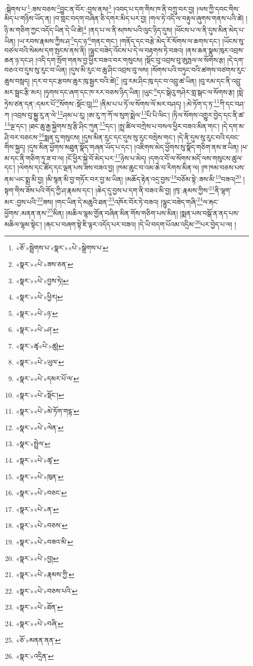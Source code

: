 :སྒེགས་པ་\footnote{«ཅོ་»སྦྲེགས་པ་«སྣར་»«པེ་»སྒྲེགས་པ་}:ཟས་བཅས་\footnote{«སྣར་»«པེ་»ཟས་ཅན་}བྱུང་ན་བོར་:བྱས་ནས།\footnote{«སྣར་»«པེ་»བྱས་ཏེ།} །འབད་པ་དག་གིས་ཁ་ནི་བཀྲུ་བར་བྱ། །ལས་ཀྱི་དབང་གིས་མིད་པ་གཉིས་ཡོད་ན། །བ་གླང་བདག་བཞིན་ཅི་དགར་མིད་པར་བྱ། །གལ་ཏེ་འདི་ལ་བརྟུལ་ཞུགས་གནས་པའི་ཚེ། །ཉི་མ་གཅིག་ཀྱང་འདོད་ཡིན་དེ་ཡི་ཚེ།\footnote{«སྣར་»«པེ་»ཕྱིར།} །ནད་པ་ལ་ནི་མཁས་པའི་ལུང་ཉིད་དུས། །ཕོངས་པ་ལ་ནི་དུས་མིན་མེད་པ་ཡིན། །ཡ་རབས་རྣམས་ཀྱིས་ཤ་\footnote{«སྣར་»«པེ་»ཉ་}དང་ཉ་\footnote{«སྣར་»«པེ་»ཤ་}གནང་གང་། །གནོད་དང་བརྩེ་མེད་རོ་སོགས་ལ་ཆགས་དང་། །ཡོངས་སུ་བཙལ་བའི་སེམས་དག་སྤངས་ནས་ནི། །ལྷུང་བཟེད་འོངས་པ་དེ་ལ་བརྟགས་ཏེ་བཟའ། །ནས་ཆན་སྣུམ་ཁུར་འབྲས་ཆན་ཉ་དང་ཤ །འདི་དག་སྲོག་གནས་བྱ་ཕྱིར་བཟའ་བར་གསུངས། །སྡོང་བུ་འབྲས་བུ་ཨུཏྤལ་ལ་སོགས་རྩ། །དེ་དག་བཅའ་བ་དུས་སུ་རུང་བ་ཡིན། །དུས་མི་རུང་བ་ཆུ་ཤིང་འབྲས་བུ་ལས། །སོགས་པའི་བཏུང་བའི་ཚགས་བཙགས་རུང་ཆུས་བསླད། །དར་བ་དང་རྩབས་ཆུར་ཁུ་སྦྱར་བའི་ཚེ།\footnote{«སྣར་»ཚྭ«པེ་»ཚུ།} །བུ་རམ་ཤིང་ཁུ་དང་བ་འབྲུ་ཚ་ཡིན། །བུ་རམ་དང་ནི་འབྲུ་མར་སྦྲང་རྩི་མར། །ཧྭགས་དང་ཞག་དང་ཁ་རར་བཅས་ཉིད་ཡིན། །ཡུང་\footnote{«སྣར་»«པེ་»ཡུལ་}དང་སྒེའུ་གཤེར་གླ་སྒང་ལ་སོགས་རྩ། །སླེ་ཏྲེས་ཙན་དན་:དམར་པོ་\footnote{«སྣར་»«པེ་»དམར་པོ་ལ་}སོགས་:སྡོང་བུ།\footnote{«སྣར་»«པེ་»སྡོང་།} །ནིམ་པ་པ་ཏོ་ལ་སོགས་ལོ་མར་བཤད། །:མེ་ཏོག་ད་ཏ་\footnote{«སྣར་»«པེ་»མེ་ཏོག་གདྷ་}ཀི་དང་བཤ་ཀ །འབྲས་བུ་སྐྱུ་རུ་ན་ལེ་\footnote{«སྣར་»«པེ་»ལེན་}ཤམ་པ་རུ། །ཨ་རུ་ཀ་ཀོ་ལ་སུག་སྨེལ་\footnote{«སྣར་»སྤྲེལ་}པི་པི་ལིང་། །ཏིལ་སོགས་འགྱུར་བྱེད་དང་ནི་ཚ་\footnote{«སྣར་»«པེ་»ཚྭ་}ལྔ་དང་། །ཐང་ཆུ་རྒྱ་སྐྱེགས་སྲ་རྩི་ཤིང་ཀུན་\footnote{«སྣར་»«པེ་»ཁུན་}དང་། །སྤྲ་ཚིལ་བཀྲེས་པ་བསལ་ཕྱིར་བཟའ་མིན་གང་། །དེ་དག་མ་ཤི་བར་བཅངས་\footnote{«སྣར་»«པེ་»བཅང་}སྨན་དུ་གསུངས། །དུས་མིན་རུང་དང་དུས་སུ་རུང་བསྲེས་གང་། །དེ་ནི་དུས་སུ་རུང་བའི་དབང་གིས་སྐྱད། །དུས་མིན་ཕྱོགས་མཐུན་སྣོད་གཞན་ཡོད་པ་དང་། །འཇིགས་མེད་ཕྱོགས་སུ་སྣོད་གཅིག་ནས་ཟ་ཡིན། །ཕ་མ་དང་ནི་གཅིག་ཏུ་ཟ་བ་ལ། །ངོ་ཕྱིར་སྐྱེ་བོ་མེད་པར་\footnote{«སྣར་»«པེ་»ན་}ཉེས་པ་མེད། །དགའ་བོ་ལ་སོགས་མདོ་ལས་གསུངས་ཚུལ་དང་། །ལེགས་དང་ཚོད་དང་ལྡན་པས་ཟས་བཟའ་བྱ། །ཁམ་ཆུང་བ་འམ་ཆེ་བ་རིགས་མིན་ལ། །ཁ་ཁམ་བཅས་པས་ནམ་ཡང་སྨྲ་མི་བྱ། །མི་སྙན་མི་བྱ་གཏོར་བར་བྱ་མ་ཡིན། །མཆོད་རྟེན་འདྲ་བྱས་\footnote{«སྣར་»«པེ་»བཅས་}བཅོམ་སྟེ་:ཟས་མི་\footnote{«སྣར་»«པེ་»བཟའ་མི་}བཟའ།\footnote{«སྣར་»«པེ་»བྱ།} །སྟག་གིས་ཟོས་པའི་གོད་ཀྱི་ཤ་རྣམས་དང་། །ཆེད་དུ་བྱས་པ་དག་ནི་བཟའ་མི་བྱ། །ཁྭ་:རྣམས་ཀྱིས་\footnote{«སྣར་»«པེ་»རྣམས་ཀྱི་}ནི་ལྷག་མར་:བྱས་པའི་\footnote{«སྣར་»«པེ་»བཅས་པའི་}ཟས། །གང་ཡིན་དེ་མཆུའི་ཐན་\footnote{«སྣར་»«པེ་»ཐོན་}འཁོར་བོར་ཏེ་བཟའ། །ལྷུང་བཟེད་གཞི་\footnote{«སྣར་»«པེ་»བཞི་}ལ་རྐང་ཕྱོགས་:མནན་ནས་\footnote{«ཅོ་»མནན་ནན་}མིན། །མཆིལ་ལྷམ་གྱོན་བཞིན་མིན་གོས་གཅིག་པས་མིན། །སྨན་པས་བསྒོ་ན་ནད་པས་མཆིལ་ལྷམ་སྟེང་། །རྐང་པ་བཞག་སྟེ་ཇི་ལྟར་འདོད་པར་བཟའ། །དེ་ཡི་བདག་པོའམ་འདྲིམ་\footnote{«སྣར་»འདྲིན་}པར་བྱེད་པ་ལ། །
